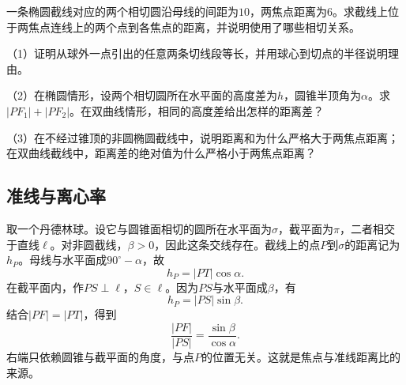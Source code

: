 \begin{example}
一条椭圆截线对应的两个相切圆沿母线的间距为\(10\)，两焦点距离为\(6\)。求截线上位于两焦点连线上的两个点到各焦点的距离，并说明使用了哪些相切关系。
\end{example}

\begin{exercise}
\mbox{}

\begin{samepage}
（1）证明从球外一点引出的任意两条切线段等长，并用球心到切点的半径说明理由。
\par
\end{samepage}

\begin{samepage}
（2）在椭圆情形，设两个相切圆所在水平面的高度差为\(h\)，圆锥半顶角为\(\alpha\)。求\(|PF_1|+|PF_2|\)。在双曲线情形，相同的高度差给出怎样的距离差？
\par
\end{samepage}

\begin{samepage}
（3）在不经过锥顶的非圆椭圆截线中，说明距离和为什么严格大于两焦点距离；在双曲线截线中，距离差的绝对值为什么严格小于两焦点距离？
\par
\end{samepage}
\end{exercise}

\subsection{准线与离心率}
\label{subsec:quadratic-directrices-and-eccentricity}

取一个丹德林球。设它与圆锥面相切的圆所在水平面为\(\sigma\)，截平面为\(\pi\)，二者相交于直线\(\ell\)。对非圆截线，\(\beta>0\)，因此这条交线存在。截线上的点\(P\)到\(\sigma\)的距离记为\(h_P\)。母线与水平面成\(90^\circ-\alpha\)，故
\begin{equation*}
    h_P=|PT|\cos\alpha .
\end{equation*}
在截平面内，作\(PS\perp\ell\)，\(S\in\ell\)。因为\(PS\)与水平面成\(\beta\)，有
\begin{equation*}
    h_P=|PS|\sin\beta .
\end{equation*}
结合\(|PF|=|PT|\)，得到
\begin{equation}\label{eq:quadratic-eccentricity-angle}
    \frac{|PF|}{|PS|}=\frac{\sin\beta}{\cos\alpha} .
\end{equation}
右端只依赖圆锥与截平面的角度，与点\(P\)的位置无关。这就是焦点与准线距离比的来源。

